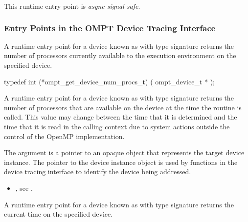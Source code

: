 This runtime entry point is \emph{async signal safe}.




\subsubsection{Entry Points in the OMPT Device Tracing Interface}
\label{sec:ompt-tracing-entry-points}


\label{sec:ompt_get_device_num_procs_t}

\summary

A runtime entry point for a device known as
 with type signature
 returns
the number of processors currently available to the execution
environment on the specified device.

\format
\begin{ccppspecific}
\begin{omptInquiry}
typedef int (*ompt_get_device_num_procs_t) (
  ompt_device_t *
);
\end{omptInquiry}
\end{ccppspecific}

\descr
A runtime entry point for a device known
as  with type signature
 returns the
number of processors that are available on the device at the time
the routine is called. This value may change between the time that
it is determined and the time that it is read in the calling context due to
system actions outside the control of the OpenMP implementation.

\argdesc

The argument  is a pointer to an opaque object that
represents the target device instance. The pointer to the device
instance object is used by functions in the device tracing interface
to identify the device being addressed.

\crossreferences
\begin{itemize}
\item {},
see .
\end{itemize}

\label{sec:ompt_get_device_time_t}

\summary
A runtime entry point for a device known
as 
with type signature 
returns the current time on the specified device.

